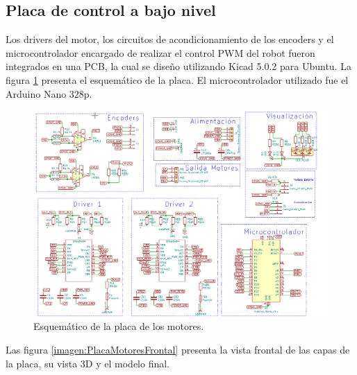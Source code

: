 \subsection{Placa de control a bajo nivel}
Los drivers del motor, los circuitos de acondicionamiento de los encoders y el microcontrolador encargado de realizar el control PWM del robot fueron integrados en una PCB, la cual se diseño utilizando Kicad 5.0.2 para Ubuntu. La figura \ref{imagen:PlacaMotores} presenta el esquemático de la placa. El microcontrolador utilizado fue el Arduino Nano 328p.


\begin{figure}[H]
	\centering		\includegraphics[width=1.0\linewidth]{imagenes/prototipo/Placa/PlacaMotores}
	\caption{Esquemático de la placa de los motores.}
	\label{imagen:PlacaMotores}
\end{figure}

Las figura \ref{imagen:PlacaMotoresFrontal} presenta la vista frontal de las capas de la placa, su vista 3D y el modelo final.




